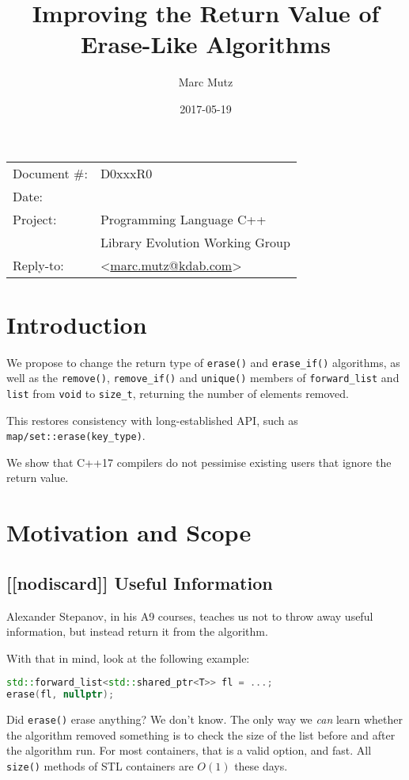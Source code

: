 \documentclass[11pt]{article}
\date{}
\title{Improving the Return Value of Erase-Like Algorithms}
\makeatletter
\newcommand{\emailaddress}{marc.mutz@kdab.com}
\newcommand{\email}{\href{mailto:\emailaddress}{\emailaddress}}
\makeatother
\begin{document}
\maketitle\vspace{-2cm}

\begin{flushright}
  \begin{tabular}{ll}
  Document \#:&D0xxxR0\\
  Date:       &\date{2017-05-19}\\
  Project:    &Programming Language C++\\
              &Library Evolution Working Group\\
  Reply-to:   &\author{Marc Mutz} \textless\email\textgreater
  \end{tabular}
\end{flushright}

\section{Introduction}

We propose to change the return type of \cite{LFv2TS} \texttt{erase()}
and \texttt{erase\_if()} algorithms, as well as the \texttt{remove()},
\texttt{remove\_if()} and \texttt{unique()} members of
\texttt{forward\_list} and \texttt{list} from \texttt{void} to
\texttt{size\_t}, returning the number of elements removed.

This restores consistency with long-established API, such as
\texttt{map/set::erase(key\_type)}.

We show that C++17 compilers do not pessimise existing users that
ignore the return value.

\section{Motivation and Scope}

\subsection{[[nodiscard]] Useful Information}

Alexander Stepanov, in his A9 courses\cite{A9}, teaches us not to
throw away useful information, but instead return it from the
algorithm.

With that in mind, look at the following example:
\begin{lstlisting}[language=C++]
std::forward_list<std::shared_ptr<T>> fl = ...;
erase(fl, nullptr);
\end{lstlisting}
Did \texttt{erase()} erase anything? We don't know. The only way we
\emph{can} learn whether the algorithm removed something is to check
the size of the list before and after the algorithm run. For most
containers, that is a valid option, and fast. All \texttt{size()}
methods of STL containers are $O(1)$ these days.
\end{document}
